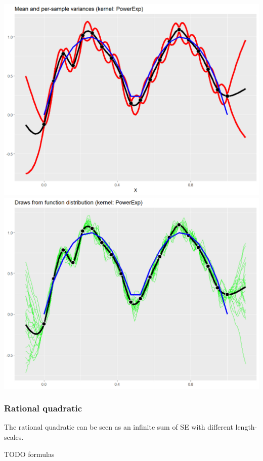 \documentclass[10pt]{article}
\begin{document}
\includegraphics[height=0.5\textwidth]{powerexp_variances.png} \\
\includegraphics[height=0.5\textwidth]{powerexp_draws.png} \\

\subsubsection{Rational quadratic}
The rational quadratic can be seen as an infinite sum of SE with different length-scales.

TODO formulas
\end{document}

